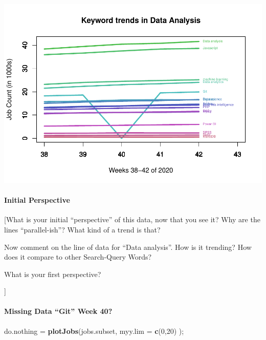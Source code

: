 \documentclass[
]{article}
\newenvironment{Shaded}{\begin{snugshade}}{\end{snugshade}}
\newcommand{\DataTypeTok}[1]{\textcolor[rgb]{0.13,0.29,0.53}{#1}}
\newcommand{\DecValTok}[1]{\textcolor[rgb]{0.00,0.00,0.81}{#1}}
\newcommand{\KeywordTok}[1]{\textcolor[rgb]{0.13,0.29,0.53}{\textbf{#1}}}
\newcommand{\NormalTok}[1]{#1}
\newcommand{\StringTok}[1]{\textcolor[rgb]{0.31,0.60,0.02}{#1}}
\begin{document}
\includegraphics{graphics/chunk-plotting-jobs-trends-intro-2.pdf}

\hypertarget{initial-perspective}{%
\paragraph{Initial Perspective}\label{initial-perspective}}

{[}What is your initial ``perspective'' of this data, now that you see
it? Why are the lines ``parallel-ish''? What kind of a trend is that?

Now comment on the line of data for ``Data analysis''. How is it
trending? How does it compare to other Search-Query Words?

What is your first perspective?

{]}

\hypertarget{missing-data-git-week-40}{%
\paragraph{Missing Data ``Git'' Week
40?}\label{missing-data-git-week-40}}

\begin{Shaded}
\begin{Highlighting}[]
\NormalTok{do.nothing =}\StringTok{ }\KeywordTok{plotJobs}\NormalTok{(jobs.subset, }\DataTypeTok{myy.lim =} \KeywordTok{c}\NormalTok{(}\DecValTok{0}\NormalTok{,}\DecValTok{20}\NormalTok{) );}
\end{Highlighting}
\end{Shaded}
\end{document}
